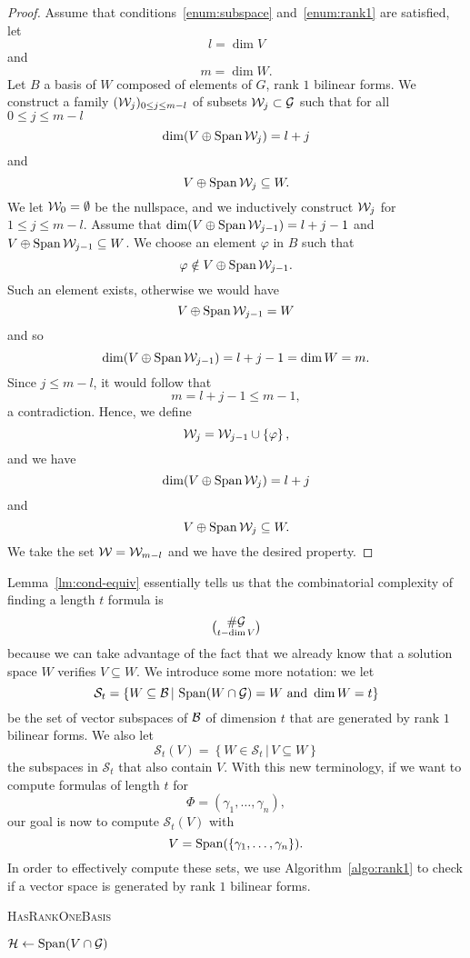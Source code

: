 \begin{proof}
  Assume that conditions~\ref{enum:subspace} and~\ref{enum:rank1} are satisfied,
  let
  \[
    l = \dim V
  \]
  and
  \[
    m = \dim W.
  \]
  Let $B$ a basis of $W$ composed of elements of $G$, \ie rank $1$ bilinear
  forms. We construct a family $(\mathcal{W}_j)_{0\leq j\leq m-l}$ of subsets
  $\mathcal{W}_j\subset\mathcal{G}$ such that for all
  $0\leq j\leq m-l$
  \[
    \dim(V\oplus\operatorname{Span}\mathcal{W}_j) = l+j
  \]
  and
  \[
    V\oplus\operatorname{Span}\mathcal{W}_j \subseteq W.
  \]
  We let $\mathcal{W}_0=\emptyset$ be the nullspace, and we inductively construct $\mathcal{W}_j$
  for $1\leq j\leq m-l$. Assume that  $\dim(V\oplus\operatorname{Span}\mathcal{W}_{j-1}) = l+j-1$ and
  $V\oplus\operatorname{Span}\mathcal{W}_{j-1} \subseteq W$. We choose an element $\varphi$ in $B$ such
  that
  \[
    \varphi\notin V\oplus\operatorname{Span}\mathcal{W}_{j-1}.
  \]
  Such an element exists, otherwise we would have
  \[
    V\oplus\operatorname{Span}\mathcal{W}_{j-1}=W
  \]
  and so 
  \[
    \dim(V\oplus\operatorname{Span}\mathcal{W}_{j-1}) = l+j-1=\dim W = m.
  \]
  Since $j\leq m-l$, it would follow that
  \[
    m = l+j-1\leq m-1,
  \]
  a contradiction. Hence, we define 
  \[
    \mathcal{W}_j = \mathcal{W}_{j-1}\cup\left\{ \varphi \right\},
  \]
  and we have
  \[
    \dim(V\oplus\operatorname{Span}\mathcal{W}_j) = l+j
  \]
  and
  \[
    V\oplus\operatorname{Span}\mathcal{W}_j \subseteq W.
  \]
  We take the set $\mathcal{W} = \mathcal{W}_{m-l}$ and we have the desired property.
\end{proof}
Lemma~\ref{lm:cond-equiv} essentially tells us that the combinatorial complexity
of finding a length $t$ formula is
\[
  {\#\mathcal{G}}\choose{t - \dim V}
\]
because we can take advantage of the fact that we already know that a solution
space $W$ verifies $V\subseteq W$. We introduce some more notation: we let
\[
  \mathcal S_t=\left\{ W\subseteq\mathcal{B}\,|\,\operatorname{Span}(W\cap\mathcal{G})=W\text{ and } \dim W = t\right\}
\]
be the set of vector subspaces of $\mathcal{B}$ of dimension $t$ that are generated by
rank $1$ bilinear forms. We also let
\[
  \mathcal S_t(V)=\left\{ W\in\mathcal S_t\,|\,V\subseteq W \right\}
\]
the subspaces in $\mathcal S_t$ that also contain $V$. With this new
terminology, if we want to compute formulas of length $t$ for
\[
  \Phi = (\gamma_1, \dots, \gamma_n),
\]
our goal is now to compute $\mathcal S_t(V)$ with
\[
  V = \operatorname{Span}(\left\{ \gamma_1, \dots, \gamma_n \right\}).
\]
In order to effectively compute these sets, we use Algorithm~\ref{algo:rank1} to
check if a vector space is generated by rank $1$ bilinear forms.
\begin{algorithm}
  \caption{\textsc{HasRankOneBasis}}
  \label{algo:rank1}
  \begin{algorithmic}[1]
    \State $\mathcal H\gets \operatorname{Span}(V\cap\mathcal{G})$
    \State \Return{\True}
    \Else
    \State \Return{\False}
    \EndIf
  \end{algorithmic}
\end{algorithm}
